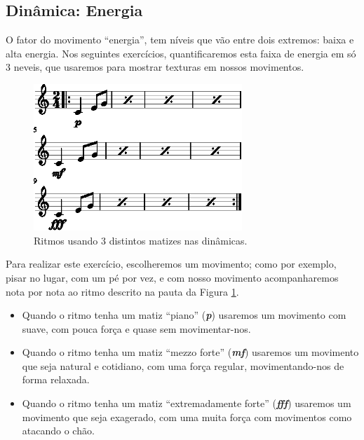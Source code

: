 \subsection{Dinâmica: Energia }
\label{sec:musicalidadenergia}
O fator do movimento ``energia'', 
tem níveis  que vão entre dois extremos: baixa e alta energia.
Nos seguintes exercícios, quantificaremos esta faixa de energia em só 3 neveis,
que usaremos para mostrar texturas em nossos movimentos.

\begin{figure}[!h]
  \centering
    \includegraphics[width=0.7\textwidth]{chapters/cap-musicalidade/dinamica-energia-1.eps}
\caption{Ritmos usando 3 distintos matizes nas dinâmicas.}
\label{fig:dinamica-energia-ex1}
\end{figure}

\begin{example}
Para realizar este exercício, escolheremos um movimento; como por exemplo,
pisar no lugar, com um pé por vez, 
e com nosso movimento  acompanharemos nota por nota 
ao ritmo descrito na pauta da Figura \ref{fig:dinamica-energia-ex1}.
\begin{itemize}
\item Quando o ritmo tenha um matiz ``piano'' (\textbf{\textit{p}}) 
usaremos um movimento com suave,
com pouca força e quase sem movimentar-nos.
\item Quando o ritmo tenha um matiz ``mezzo forte'' (\textbf{\textit{mf}}) 
usaremos um movimento que seja natural e cotidiano,
com uma força regular, movimentando-nos de forma relaxada.
\item Quando o ritmo tenha um matiz ``extremadamente forte''  (\textbf{\textit{fff}}) 
usaremos um movimento que seja exagerado,
com uma muita força com movimentos como atacando o chão.
\end{itemize}
\end{example}

